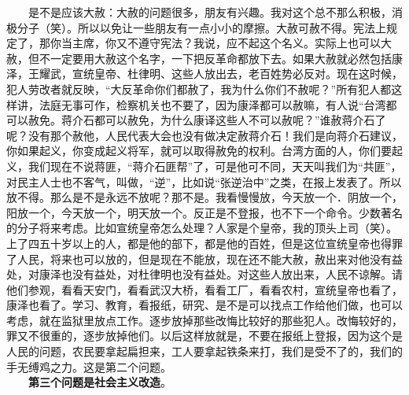 \documentclass[cn,11pt,chinese]{elegantbook}
\begin{document}
　　是不是应该大赦：大赦的问题很多，朋友有兴趣。我对这个总不那么积极，消极分子（笑）。所以以免让一些朋友有一点小小的摩擦。大赦可赦不得。宪法上规定了，那你当主席，你又不遵守宪法？我说，应不起这个名义。实际上也可以大赦，但不一定要用大赦这个名字，一下把反革命都放下去。如果大赦就必然包括康泽，王耀武，宣统皇帝、杜律明、这些人放出去，老百姓势必反对。现在这时候，犯人劳改者就反映，“大反革命你们都赦了，我为什么你们不赦呢？”所有犯人都这样讲，法庭无事可作，检察机关也不要了，因为康泽都可以赦嘛，有人说“台湾都可以赦免。蒋介石都可以赦免，为什么康译这些人不可以赦呢？”谁赦蒋介石了呢？没有那个赦他，人民代表大会也没有做决定赦蒋介石！我们是向蒋介石建议，你如果起义，你变成起义将军，就可以取得赦免的权利。台湾方面的人，你们要起义，我们现在不说蒋匪，“蒋介石匪帮”了，可是他可不同，天天叫我们为“共匪”，对民主人士也不客气，叫做，“逆”，比如说“张逆治中”之类，在报上发表了。所以放不得。那么是不是永远不放呢？那不是。我看慢慢放，今天放一个．阴放一个，阳放一个，今天放一个，明天放一个。反正是不登报，也不下一个命令。少数著名的分子将来考虑。比如宣统皇帝怎么处理？人家是个皇帝，我的顶头上司（笑）。上了四五十岁以上的人，都是他的部下，都是他的百姓，但是这位宣统皇帝也得罪了人民，将来也可以放的，但是现在不能放，现在还不能大赦，赦出来对他没有益处，对康泽也没有益处，对杜律明也没有益处。对这些人放出来，人民不谅解。请他们参观，看看天安门，看看武汉大桥，看看工厂，看看农村，宣统皇帝也看了，康泽也看了。学习、教育，看报纸，研究、是不是可以找点工作给他们做，也可以考虑，就在监狱里放点工作。逐步放掉那些改悔比较好的那些犯人。改悔较好的，罪又不很重的，逐步放掉他们。以后这样放就是，不要在报纸上登报，因为这个是人民的问题，农民要拿起扁担来，工人要拿起铁条来打，我们是受不了的，我们的手无缚鸡之力。这是第二个问题。\\
　　\textbf{第三个问题是社会主义改造}。\\
\end{document}
